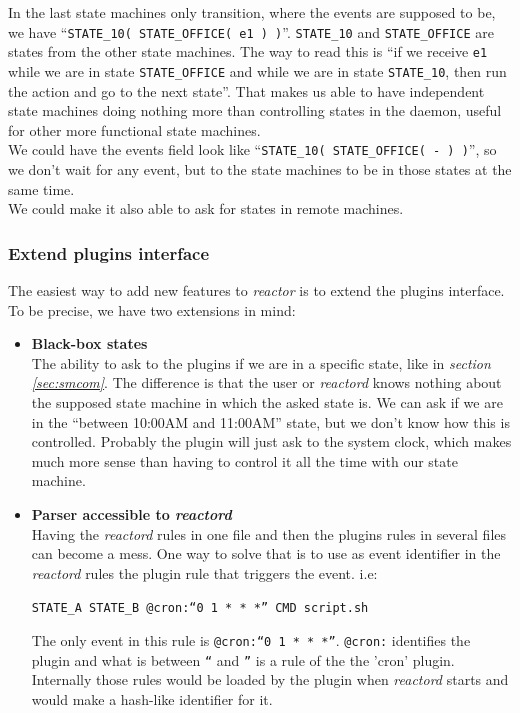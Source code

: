 In the last state machines only transition, where the events are supposed to be, we have ``\texttt{STATE\_10( STATE\_OFFICE( e1 ) )}''.
\texttt{STATE\_10} and \texttt{STATE\_OFFICE} are states from the other state machines. The way to read this is ``if we receive \texttt{e1}
while we are in state \texttt{STATE\_OFFICE} and while we are in state \texttt{STATE\_10}, then run the action and go to the next state''.
That makes us able to have independent state machines doing nothing more than controlling states in the daemon, useful for other 
more functional state machines.\\
We could have the events field look like ``\texttt{STATE\_10( STATE\_OFFICE( - ) )}'', so we don't wait for any event, but to the state 
machines to be in those states at the same time.\\
We could make it also able to ask for states in remote machines.
\subsubsection{Extend plugins interface}
The easiest way to add new features to \emph{reactor} is to extend the plugins interface. To be precise, we have two extensions in mind:
\begin{itemize}
  \item {\bf Black-box states}\\
    The ability to ask to the plugins if we are in a specific state, like in \emph{section \ref{sec:smcom}}. The difference is that the
    user or \emph{reactord} knows nothing about the supposed state machine in which the asked state is. We can ask if we are in the 
    ``between 10:00AM and 11:00AM'' state, but we don't know how this is controlled. Probably the plugin will just ask to the system clock,
    which makes much more sense than having to control it all the time with our state machine.
  \item {\bf Parser accessible to \emph{reactord}}\\
    Having the \emph{reactord} rules in one file and then the plugins rules in several files can become a mess. One way to solve that is to
    use as event identifier in the \emph{reactord} rules the plugin rule that triggers the event. i.e:
    \begin{center}
      \texttt{STATE\_A STATE\_B @cron:``0 1 * * *'' CMD script.sh}
    \end{center}
    The only event in this rule is \texttt{@cron:``0 1 * * *''}. \texttt{@cron:} identifies the plugin and what is between \texttt{``} and
    \texttt{''} is a rule of the the 'cron' plugin.\\
    Internally those rules would be loaded by the plugin when \emph{reactord} starts and would make a hash-like identifier for it.
\end{itemize}

